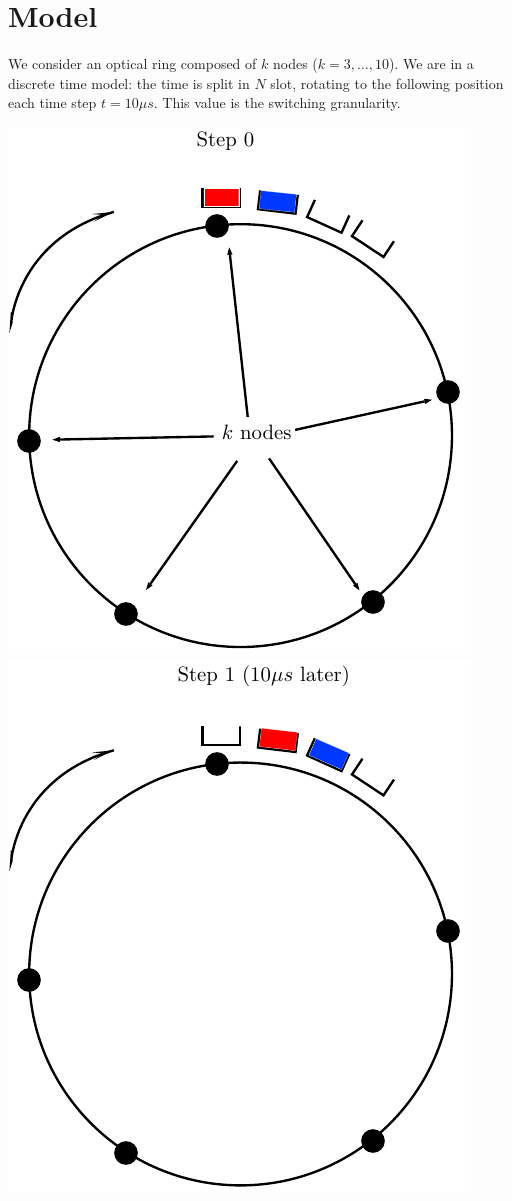 \documentclass[a4paper,10pt]{article}
\begin{document}
\section*{Model}
We consider an optical ring composed of $k$ nodes ($k={3,...,10}$).
We are in a discrete time model: the time is split in $N$ slot, rotating to the following position each time step $t = 10 \mu s$. This value is the switching granularity.
\begin{center}   

      \includegraphics[scale=0.5]{anneau1.pdf}
      \hspace{3cm}
      \includegraphics[scale=0.5]{anneau2.pdf}
  
\end{center}
\end{document}
